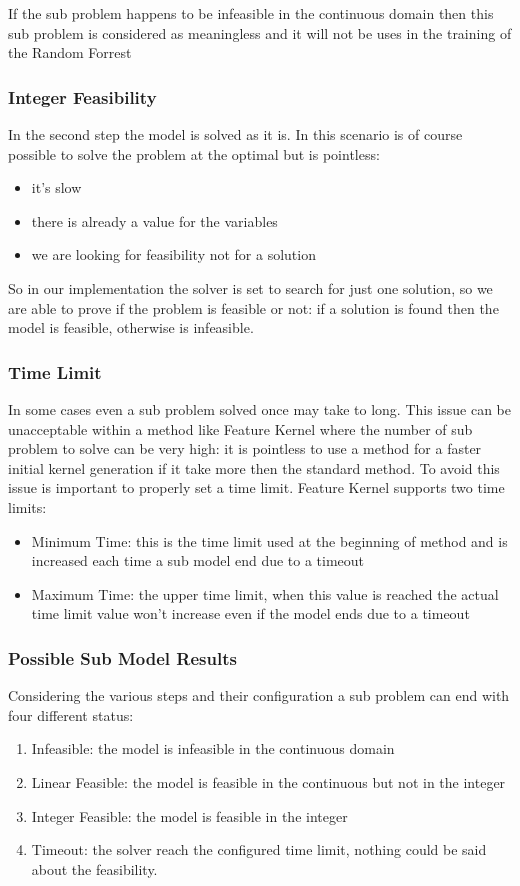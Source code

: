 If the sub problem happens to be infeasible in the continuous domain then this sub problem is considered as meaningless and it will not be uses in the training of the Random Forrest


\subsubsection{Integer Feasibility}
In the second step the model is solved as it is. In this scenario is of course possible to solve the problem at the optimal but is pointless: 
\begin{itemize}
    \item it's slow
    \item there is already a value for the variables
    \item we are looking for feasibility not for a solution
\end{itemize}
So in our implementation the solver is set to search for just one solution, so we are able to prove if the problem is feasible or not: if a solution is found then the model is feasible, otherwise
is infeasible.


\subsubsection{Time Limit}\label{sec:timeout}
In some cases even a sub problem solved once may take to long. This issue can be unacceptable within a method like Feature Kernel where the number of sub problem to solve can be very high: it 
is pointless to use a method for a faster initial kernel generation if it take more then the standard method. To avoid this issue is important to properly set a time limit. Feature Kernel
supports two time limits:
\begin{itemize}
    \item Minimum Time: this is the time limit used at the beginning of method and is increased each time a sub model end due to a timeout
    \item Maximum Time: the upper time limit, when this value is reached the actual time limit value won't increase even if the model ends due to a timeout
\end{itemize}


\subsubsection{Possible Sub Model Results}\label{sec:submodel-result}
Considering the various steps and their configuration a sub problem can end with four different status:
\begin{enumerate}
    \item Infeasible: the model is infeasible in the continuous domain
    \item Linear Feasible: the model is feasible in the continuous but not in the integer
    \item Integer Feasible: the model is feasible in the integer
    \item Timeout: the solver reach the configured time limit, nothing could be said about the feasibility. 
\end{enumerate}

